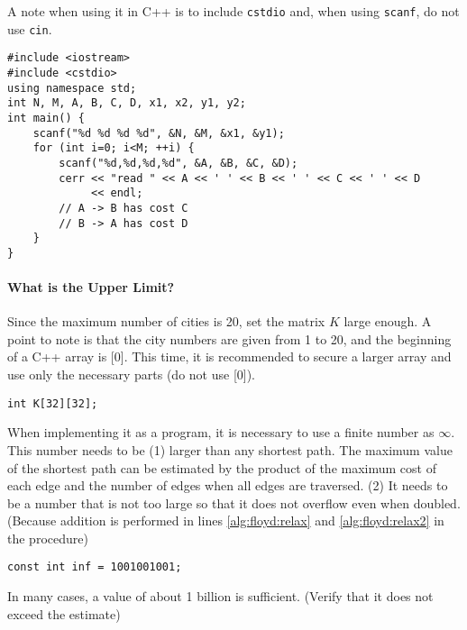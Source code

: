 A note when using it in C++ is to include \texttt{cstdio} and, when using \texttt{scanf}, do not use \texttt{cin}.

\begin{cbox}
\begin{verbatim}
#include <iostream>
#include <cstdio>
using namespace std;
int N, M, A, B, C, D, x1, x2, y1, y2;
int main() {
    scanf("%d %d %d %d", &N, &M, &x1, &y1);
    for (int i=0; i<M; ++i) {
        scanf("%d,%d,%d,%d", &A, &B, &C, &D);
        cerr << "read " << A << ' ' << B << ' ' << C << ' ' << D
             << endl;
        // A -> B has cost C
        // B -> A has cost D
    }
}
\end{verbatim}
\end{cbox}

\paragraph{What is the Upper Limit?}

Since the maximum number of cities is 20, set the matrix $K$ large enough.
A point to note is that the city numbers are given from 1 to 20, and the beginning of a C++ array is [0]. This time, it is recommended to secure a larger array and use only the necessary parts (do not use [0]).

\begin{cbox}
\begin{verbatim}
int K[32][32];
\end{verbatim}
\end{cbox}

When implementing it as a program, it is necessary to use a finite number as $\infty$.
This number needs to be (1) larger than any shortest path. The maximum value of the shortest path can be estimated by the product of the maximum cost of each edge and the number of edges when all edges are traversed. (2) It needs to be a number that is not too large so that it does not overflow even when doubled. (Because addition is performed in lines \ref{alg:floyd:relax} and \ref{alg:floyd:relax2} in the procedure)

\begin{cbox}
\begin{verbatim}
const int inf = 1001001001;
\end{verbatim}
\end{cbox}

In many cases, a value of about 1 billion is sufficient. (Verify that it does not exceed the estimate)

